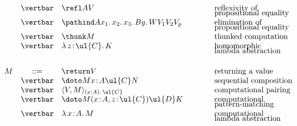 \begin{definition}
\[\begin{array}{r c l @{\qquad\qquad}l}
& \vertbar & \refl A V & \text{reflexivity of}
\\[-2mm]
& & & \text{propositional equality}
\\
& \vertbar & \pathind A {x_1.\, x_2.\, x_3.\, B} {y.\, W} {V_1} {V_2} {V_p} & \text{elimination of}
\\[-2mm]
& & & \text{propositional equality}
\\
& \vertbar & \thunk M & \text{thunked computation}
\\
& \vertbar & \lambda\, z \!:\! \ul{C} .\, K & \text{homomorphic}
\\[-2mm]
& & & \text{lambda abstraction}
\\[5mm]
\index{term!computation --}
M & ::= & \return V & \text{returning a value}
\\
& \vertbar & \doto M {x \!:\! A} {\ul{C}} N & \text{sequential composition}
\\
& \vertbar & \langle V , M \rangle_{(x : A).\, \ul{C}} & \text{computational pairing}
\\
& \vertbar & \doto M {(x \!:\! A, z \!:\! \ul{C})} {\ul{D}} K & \text{computational}
\\[-2mm]
& & & \text{pattern-matching}
\\
& \vertbar & \lambda \, x \!:\! A .\, M & \text{computational}
\\[-2mm]
& & & \text{lambda abstraction}
\end{array}
\]


\end{definition}
